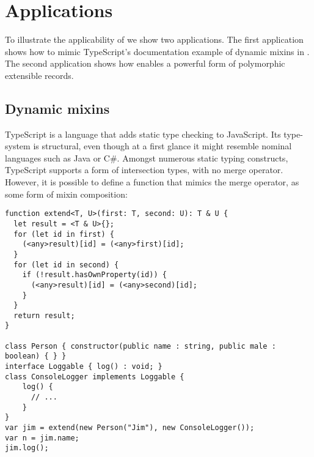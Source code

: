 \section{Applications}
\label{subsec:records}

To illustrate the applicability of \name we show two applications. The
first application shows how to mimic TypeScript's documentation example of 
dynamic mixins in \name. The second application shows how \name
enables a powerful form of polymorphic extensible records.

\subsection{Dynamic mixins}


TypeScript is a language that adds static type checking to JavaScript.
Its type-system is structural, even though at a first glance it might resemble 
nominal languages such as Java or C\#.
Amongst numerous static typing constructs, TypeScript supports a form of intersection types, 
with no merge operator. 
However, it is possible to define a function 
that mimics the merge operator, as some form of mixin composition:

\begin{lstlisting}
function extend<T, U>(first: T, second: U): T & U {
  let result = <T & U>{};
  for (let id in first) {
    (<any>result)[id] = (<any>first)[id];
  }
  for (let id in second) {
    if (!result.hasOwnProperty(id)) {
      (<any>result)[id] = (<any>second)[id];
    }
  }
  return result;
}

class Person { constructor(public name : string, public male : boolean) { } }
interface Loggable { log() : void; }
class ConsoleLogger implements Loggable {
    log() {
      // ...
    }
}
var jim = extend(new Person("Jim"), new ConsoleLogger());
var n = jim.name;
jim.log();
\end{lstlisting}

